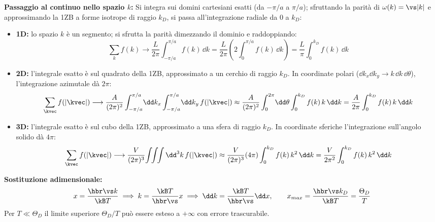 \vspace{0.3cm}

\textbf{Passaggio al continuo nello spazio $k$:} Si integra sui domini cartesiani esatti (da $-\pi/a$ a $\pi/a$); sfruttando la parità di $\omega(k)=\vs|k|$ e approssimando la 1ZB a forme isotrope di raggio $k_D$, si passa all'integrazione radiale da $0$ a $k_D$:
\begin{itemize}
    \item \textbf{1D:} lo spazio $k$ è un segmento; si sfrutta la parità dimezzando il dominio e raddoppiando:
    \[ \sum_{k} f(k) \longrightarrow \frac{L}{2\pi}\int_{-\pi/a}^{\pi/a} f(k)\,\dd k
       = \frac{L}{2\pi}\left(2\int_0^{\pi/a} f(k)\,\dd k\right) = \frac{L}{\pi}\int_0^{k_D} f(k)\,\dd k \]
    \item \textbf{2D:} l'integrale esatto è sul quadrato della 1ZB, approssimato a un cerchio di raggio $k_D$. In coordinate polari ($\dd k_x\dd k_y \to k\,\dd k\,\dd\theta$), l'integrazione azimutale dà $2\pi$:
    \[ \sum_{\kvec} f(|\kvec|) \longrightarrow \frac{A}{(2\pi)^2}\int_{-\pi/a}^{\pi/a}\!\dd k_x \int_{-\pi/a}^{\pi/a}\!\dd k_y\, f(|\kvec|)
       \approx \frac{A}{(2\pi)^2}\int_0^{2\pi}\!\dd\theta\int_0^{k_D} f(k)\,k\,\dd k = \frac{A}{2\pi}\int_0^{k_D} f(k)\,k\,\dd k \]
    \item \textbf{3D:} l'integrale esatto è sul cubo della 1ZB, approssimato a una sfera di raggio $k_D$. In coordinate sferiche l'integrazione sull'angolo solido dà $4\pi$:
    \[ \sum_{\kvec} f(|\kvec|) \longrightarrow \frac{V}{(2\pi)^3}\!\int\!\!\int\!\!\int \dd^3k\, f(|\kvec|)
       \approx \frac{V}{(2\pi)^3}(4\pi)\int_0^{k_D} f(k)\,k^2\,\dd k = \frac{V}{2\pi^2}\int_0^{k_D} f(k)\,k^2\,\dd k \]
\end{itemize}

\noindent\textbf{Sostituzione adimensionale:} 
\[ x = \frac{\hbr \vs k}{\kB T} \implies k = \frac{\kB T}{\hbr \vs}x \implies \dd k = \frac{\kB T}{\hbr \vs}\dd x, \qquad
   x_{max} = \frac{\hbr\vs k_D}{\kB T} = \frac{\Theta_D}{T} \]
Per $T \ll \Theta_D$ il limite superiore $\Theta_D/T$ può essere esteso a $+\infty$ con errore trascurabile.

